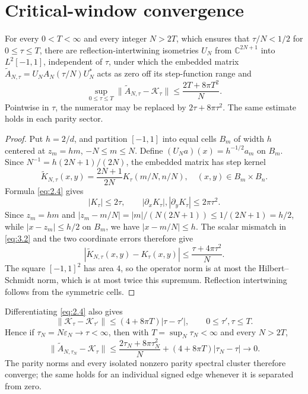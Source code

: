 \section{Critical-window convergence}\label{sec:critical}

\begin{theorem}\label{thm:nystrom}
For every $0<T<\infty$ and every integer $N>2T$, which ensures that
$\tau/N<1/2$ for $0\le\tau\le T$, there are
reflection-intertwining isometries $U_N$ from
$\mathbb C^{2N+1}$ into $L^2[-1,1]$, independent of $\tau$, under which the
embedded matrix $\widetilde A_{N,\tau}=U_NA_N(\tau/N)U_N^*$ acts as zero off
its step-function range and
\begin{equation}\label{eq:3.1}
 \sup_{0\le\tau\le T}
 \|\widetilde A_{N,\tau}-\mathcal K_\tau\|
 \le \frac{2T+8\pi T^2}{N}.
\end{equation}
Pointwise in $\tau$, the numerator may be replaced by
$2\tau+8\pi\tau^2$.  The same estimate holds in each parity sector.
\end{theorem}

\begin{proof}
Put $h=2/d$, and partition $[-1,1]$ into equal cells $B_m$
of width $h$ centered at $z_m=hm$, $-N\le m\le N$.  Define
$(U_Na)(x)=h^{-1/2}a_m$ on $B_m$.  Since
$N^{-1}=h(2N+1)/(2N)$, the embedded matrix has step kernel
\begin{equation}\label{eq:3.2}
 \widetilde K_{N,\tau}(x,y)
 =\frac{2N+1}{2N}K_\tau(m/N,n/N),
 \quad (x,y)\in B_m\times B_n.
\end{equation}
Formula \eqref{eq:2.4} gives
\begin{equation}\label{eq:3.3}
 |K_\tau|\le2\tau,\qquad
 |\partial_xK_\tau|,|\partial_yK_\tau|\le2\pi\tau^2.
\end{equation}
Since $z_m=hm$ and $|z_m-m/N|=|m|/(N(2N+1))\le1/(2N+1)=h/2$, while
$|x-z_m|\le h/2$ on $B_m$, we have $|x-m/N|\le h$.  The scalar mismatch in
\eqref{eq:3.2} and
the two coordinate errors therefore give
\[
 |\widetilde K_{N,\tau}(x,y)-K_\tau(x,y)|
 \le\frac{\tau+4\pi\tau^2}{N}.
\]
The square $[-1,1]^2$ has area $4$, so the operator norm is at most the
Hilbert--Schmidt norm, which is at most twice this supremum.  Reflection
intertwining follows from the symmetric cells.
\end{proof}

Differentiating \eqref{eq:2.4} also gives
\begin{equation}\label{eq:3.4}
 \|\mathcal K_\tau-\mathcal K_{\tau'}\|
 \le(4+8\pi T)|\tau-\tau'|,
 \qquad 0\le\tau',\tau\le T.
\end{equation}
Hence if $\tau_N=N\varepsilon_N\to\tau<\infty$, then with
$T=\sup_N\tau_N<\infty$ and every $N>2T$,
\begin{equation}\label{eq:3.5}
 \|\widetilde A_{N,\tau_N}-\mathcal K_\tau\|
 \le\frac{2\tau_N+8\pi\tau_N^2}{N}
 +(4+8\pi T)|\tau_N-\tau|\longrightarrow0.
\end{equation}
The parity norms and every isolated nonzero parity spectral cluster therefore
converge; the same holds for an individual signed edge whenever it is separated
from zero.

